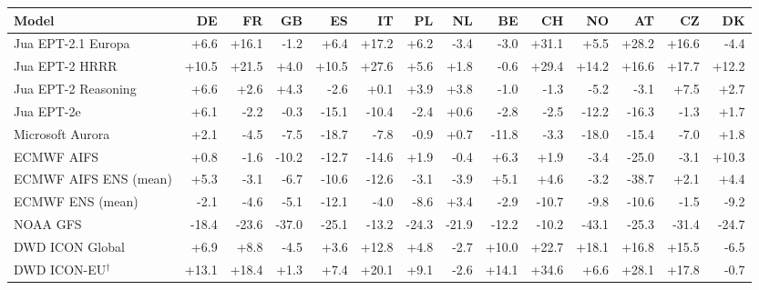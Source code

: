 \begin{tabular}{lrrrrrrrrrrrrr}
\toprule
Model & DE & FR & GB & ES & IT & PL & NL & BE & CH & NO & AT & CZ & DK \\
\midrule
Jua EPT-2.1 Europa & +6.6 & +16.1 & -1.2 & +6.4 & +17.2 & +6.2 & -3.4 & -3.0 & +31.1 & +5.5 & +28.2 & +16.6 & -4.4 \\
Jua EPT-2 HRRR & +10.5 & +21.5 & +4.0 & +10.5 & +27.6 & +5.6 & +1.8 & -0.6 & +29.4 & +14.2 & +16.6 & +17.7 & +12.2 \\
Jua EPT-2 Reasoning & +6.6 & +2.6 & +4.3 & -2.6 & +0.1 & +3.9 & +3.8 & -1.0 & -1.3 & -5.2 & -3.1 & +7.5 & +2.7 \\
Jua EPT-2e & +6.1 & -2.2 & -0.3 & -15.1 & -10.4 & -2.4 & +0.6 & -2.8 & -2.5 & -12.2 & -16.3 & -1.3 & +1.7 \\
Microsoft Aurora & +2.1 & -4.5 & -7.5 & -18.7 & -7.8 & -0.9 & +0.7 & -11.8 & -3.3 & -18.0 & -15.4 & -7.0 & +1.8 \\
ECMWF AIFS & +0.8 & -1.6 & -10.2 & -12.7 & -14.6 & +1.9 & -0.4 & +6.3 & +1.9 & -3.4 & -25.0 & -3.1 & +10.3 \\
ECMWF AIFS ENS (mean) & +5.3 & -3.1 & -6.7 & -10.6 & -12.6 & -3.1 & -3.9 & +5.1 & +4.6 & -3.2 & -38.7 & +2.1 & +4.4 \\
ECMWF ENS (mean) & -2.1 & -4.6 & -5.1 & -12.1 & -4.0 & -8.6 & +3.4 & -2.9 & -10.7 & -9.8 & -10.6 & -1.5 & -9.2 \\
NOAA GFS & -18.4 & -23.6 & -37.0 & -25.1 & -13.2 & -24.3 & -21.9 & -12.2 & -10.2 & -43.1 & -25.3 & -31.4 & -24.7 \\
DWD ICON Global & +6.9 & +8.8 & -4.5 & +3.6 & +12.8 & +4.8 & -2.7 & +10.0 & +22.7 & +18.1 & +16.8 & +15.5 & -6.5 \\
DWD ICON-EU$^{\dagger}$ & +13.1 & +18.4 & +1.3 & +7.4 & +20.1 & +9.1 & -2.6 & +14.1 & +34.6 & +6.6 & +28.1 & +17.8 & -0.7 \\
\bottomrule
\end{tabular}
